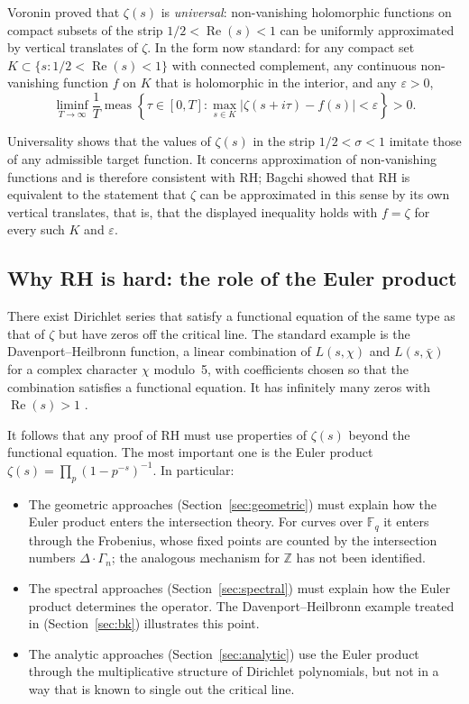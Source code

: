 \documentclass[11pt]{amsart}
\theoremstyle{definition}
\theoremstyle{remark}
\begin{document}
Voronin \cite{voronin1975} proved that $\zeta(s)$ is \emph{universal}: non-vanishing holomorphic functions on compact subsets of the strip $1/2 < \operatorname{Re}(s) < 1$ can be uniformly approximated by vertical translates of $\zeta$. In the form now standard: for any compact set $K \subset \{s : 1/2 < \operatorname{Re}(s) < 1\}$ with connected complement, any continuous non-vanishing function $f$ on $K$ that is holomorphic in the interior, and any $\varepsilon > 0$,
\[
\liminf_{T \to \infty} \frac{1}{T} \operatorname{meas}\!\left\{\tau \in [0, T] : \max_{s \in K} |\zeta(s + i\tau) - f(s)| < \varepsilon \right\} > 0.
\]

Universality shows that the values of $\zeta(s)$ in the strip $1/2 < \sigma < 1$ imitate those of any admissible target function. It concerns approximation of non-vanishing functions and is therefore consistent with RH; Bagchi \cite{bagchi1987} showed that RH is equivalent to the statement that $\zeta$ can be approximated in this sense by its own vertical translates, that is, that the displayed inequality holds with $f=\zeta$ for every such $K$ and $\varepsilon$.

\subsection{Why RH is hard: the role of the Euler product}\label{sec:whyhard}

There exist Dirichlet series that satisfy a functional equation of the same type as that of $\zeta$ but have zeros off the critical line. The standard example is the Davenport--Heilbronn function, a linear combination of $L(s,\chi)$ and $L(s,\bar\chi)$ for a complex character $\chi$ modulo~5, with coefficients chosen so that the combination satisfies a functional equation. It has infinitely many zeros with $\operatorname{Re}(s)>1$ \cite[\S10.25]{titchmarsh1986}.

It follows that any proof of RH must use properties of $\zeta(s)$ beyond the functional equation. The most important one is the Euler product $\zeta(s) = \prod_p (1 - p^{-s})^{-1}$. In particular:
\begin{itemize}
\item The geometric approaches (Section~\ref{sec:geometric}) must explain how the Euler product enters the intersection theory. For curves over $\mathbb{F}_q$ it enters through the Frobenius, whose fixed points are counted by the intersection numbers $\Delta\cdot\Gamma_n$; the analogous mechanism for $\mathbb{Z}$ has not been identified.
\item The spectral approaches (Section~\ref{sec:spectral}) must explain how the Euler product determines the operator. The Davenport--Heilbronn example treated in \cite{leclair2024} (Section~\ref{sec:bk}) illustrates this point.
\item The analytic approaches (Section~\ref{sec:analytic}) use the Euler product through the multiplicative structure of Dirichlet polynomials, but not in a way that is known to single out the critical line.
\end{itemize}
\end{document}
